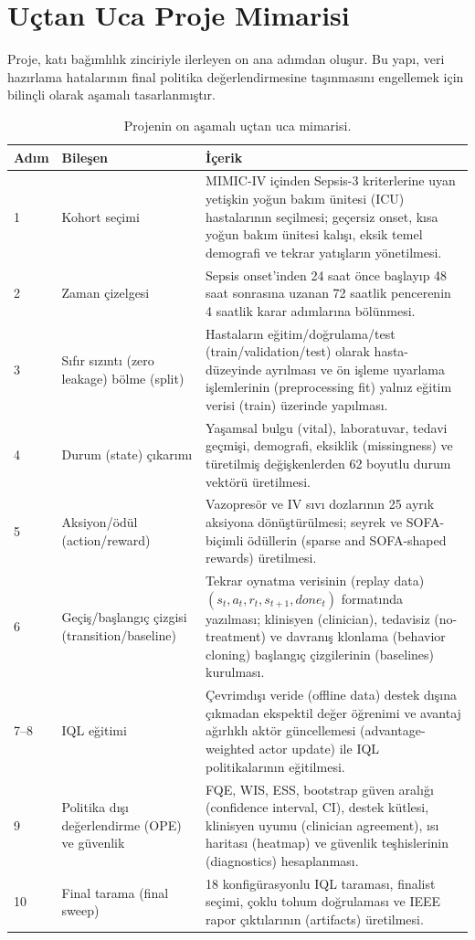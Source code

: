 \documentclass[conference]{IEEEtran}
\begin{document}
\section{Uçtan Uca Proje Mimarisi}
Proje, katı bağımlılık zinciriyle ilerleyen on ana adımdan oluşur. Bu yapı, veri hazırlama hatalarının final politika değerlendirmesine taşınmasını engellemek için bilinçli olarak aşamalı tasarlanmıştır.

\begin{table}[t]
\centering
\caption{Projenin on aşamalı uçtan uca mimarisi.}
\label{tab:ten_steps}
\begin{tabular}{p{}p{}p{}}
\toprule
Adım & Bileşen & İçerik \\
\midrule
1 & Kohort seçimi & MIMIC-IV içinden Sepsis-3 kriterlerine uyan yetişkin yoğun bakım ünitesi (ICU) hastalarının seçilmesi; geçersiz onset, kısa yoğun bakım ünitesi kalışı, eksik temel demografi ve tekrar yatışların yönetilmesi. \\
2 & Zaman çizelgesi & Sepsis onset'inden 24 saat önce başlayıp 48 saat sonrasına uzanan 72 saatlik pencerenin 4 saatlik karar adımlarına bölünmesi. \\
3 & Sıfır sızıntı (zero leakage) bölme (split) & Hastaların eğitim/doğrulama/test (train/validation/test) olarak hasta-düzeyinde ayrılması ve ön işleme uyarlama işlemlerinin (preprocessing fit) yalnız eğitim verisi (train) üzerinde yapılması. \\
4 & Durum (state) çıkarımı & Yaşamsal bulgu (vital), laboratuvar, tedavi geçmişi, demografi, eksiklik (missingness) ve türetilmiş değişkenlerden 62 boyutlu durum vektörü üretilmesi. \\
5 & Aksiyon/ödül (action/reward) & Vazopresör ve IV sıvı dozlarının 25 ayrık aksiyona dönüştürülmesi; seyrek ve SOFA-biçimli ödüllerin (sparse and SOFA-shaped rewards) üretilmesi. \\
6 & Geçiş/başlangıç çizgisi (transition/baseline) & Tekrar oynatma verisinin (replay data) $(s_t,a_t,r_t,s_{t+1},done_t)$ formatında yazılması; klinisyen (clinician), tedavisiz (no-treatment) ve davranış klonlama (behavior cloning) başlangıç çizgilerinin (baselines) kurulması. \\
7--8 & IQL eğitimi & Çevrimdışı veride (offline data) destek dışına çıkmadan ekspektil değer öğrenimi ve avantaj ağırlıklı aktör güncellemesi (advantage-weighted actor update) ile IQL politikalarının eğitilmesi. \\
9 & Politika dışı değerlendirme (OPE) ve güvenlik & FQE, WIS, ESS, bootstrap güven aralığı (confidence interval, CI), destek kütlesi, klinisyen uyumu (clinician agreement), ısı haritası (heatmap) ve güvenlik teşhislerinin (diagnostics) hesaplanması. \\
10 & Final tarama (final sweep) & 18 konfigürasyonlu IQL taraması, finalist seçimi, çoklu tohum doğrulaması ve IEEE rapor çıktılarının (artifacts) üretilmesi. \\
\bottomrule
\end{tabular}
\end{table}
\end{document}
